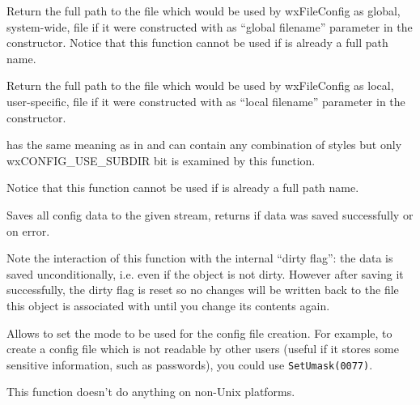 Return the full path to the file which would be used by wxFileConfig as global,
system-wide, file if it were constructed with  as ``global
filename'' parameter in the constructor. Notice that this function cannot be
used if  is already a full path name.


\label{wxfilenamegetlocalfile}


Return the full path to the file which would be used by wxFileConfig as local,
user-specific, file if it were constructed with  as ``local
filename'' parameter in the constructor.

 has the same meaning as in  
and can contain any combination of styles but only wxCONFIG\_USE\_SUBDIR bit is
examined by this function.

Notice that this function cannot be used if  is already a full
path name.


\label{wxfileconfigsave}


Saves all config data to the given stream, returns \true if data was saved
successfully or \false on error.

Note the interaction of this function with the internal ``dirty flag'': the
data is saved unconditionally, i.e. even if the object is not dirty. However
after saving it successfully, the dirty flag is reset so no changes will be
written back to the file this object is associated with until you change its
contents again.




\label{wxfileconfigsetumask}


Allows to set the mode to be used for the config file creation. For example, to
create a config file which is not readable by other users (useful if it stores
some sensitive information, such as passwords), you could use 
{\tt SetUmask(0077)}.

This function doesn't do anything on non-Unix platforms.





